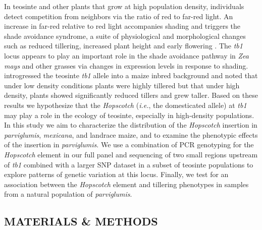 \documentclass[11pt]{article} %
\begin{document}
\begin{linenumbers}
\begin{flushleft}
In teosinte and other plants that grow at high population density, individuals detect competition from neighbors via the ratio of red to far-red light.  An increase in far-red relative to red light accompanies shading and triggers the shade avoidance syndrome, a suite of physiological and morphological changes such as reduced tillering, increased plant height and early flowering \citep{KebromBrutnell2007}. The \emph{tb1} locus appears to play an important role in the shade avoidance pathway in \emph{Zea mays} \citep{LukensDoebley1999} and other grasses \citep{KebromBrutnell2007} via changes in expression levels in response to shading. \citet{LukensDoebley1999} introgressed the teosinte \emph{tb1} allele into a maize inbred background and noted that under low density conditions plants were highly tillered but that under high density, plants showed significantly reduced tillers and grew taller. 
Based on these results we hypothesize that the \emph{Hopscotch} (\emph{i.e.}, the domesticated allele) at \emph{tb1} may play a role in the ecology of teosinte, especially in high-density populations. In this study we aim to characterize the distribution of the \emph{Hopscotch} insertion in \emph{parviglumis}, \emph{mexicana}, and landrace maize, and to examine the phenotypic effects of the insertion in \emph{parviglumis}. We use a combination of PCR genotyping for the \emph{Hopscotch} element in our full panel and sequencing of two small regions upstream of \emph{tb1} combined with a larger SNP dataset in a subset of teosinte populations to explore patterns of genetic variation at this locus. Finally, we test for an association between the \emph{Hopscotch} element and tillering phenotypes in samples from a natural population of \emph{parviglumis}.

\begin{centering}
\section*{MATERIALS \& METHODS}
\end{centering}


\end{flushleft}
\end{linenumbers}
\end{document}
